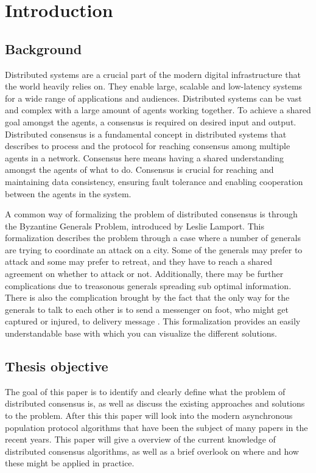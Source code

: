\section{Introduction}
\thispagestyle{empty}

\subsection{Background}

Distributed systems are a crucial part of the modern digital infrastructure that the world heavily relies on. They enable large, scalable and low-latency systems for a wide range of applications and audiences. Distributed systems can be vast and complex with a large amount of agents working together. To achieve a shared goal amongst the agents, a consensus is required on desired input and output. Distributed consensus is a fundamental concept in distributed systems that describes to process and the protocol for reaching consensus among multiple agents in a network. Consensus here means having a shared understanding amongst the agents of what to do. Consensus is crucial for reaching and maintaining data consistency, ensuring fault tolerance and enabling cooperation between the agents in the system. 

A common way of formalizing the problem of distributed consensus is through the Byzantine Generals Problem, introduced by Leslie Lamport. This formalization describes the problem through a case where a number of generals are trying to coordinate an attack on a city. Some of the generals may prefer to attack and some may prefer to retreat, and they have to reach a shared agreement on whether to attack or not. Additionally, there may be further complications due to treasonous generals spreading sub optimal information. There is also the complication brought by the fact that the only way for the generals to talk to each other is to send a messenger on foot, who might get captured or injured, to delivery message \cite{lamportByzantineGeneralsProblem}. This formalization provides an easily understandable base with which you can visualize the different solutions.



\clearpage

\subsection{Thesis objective}
The goal of this paper is to identify and clearly define what the problem of distributed consensus is,
as well as discuss the existing approaches and solutions to the problem. After this this paper will look into the modern asynchronous population protocol algorithms that have been the subject of many papers in the recent years. 
This paper will give a overview of the current knowledge of distributed consensus algorithms, as well as a brief overlook on where and how these might be applied in practice.

